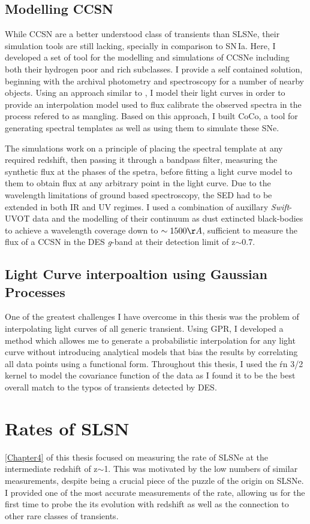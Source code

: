 \subsection{Modelling CCSN}
While CCSN are a better understood class of transients than SLSNe, their simulation tools are still lacking, specially in comparison to SN\,Ia. Here, I developed a set of tool for the modelling and simulations of CCSNe including both their hydrogen poor and rich subclasses. I provide a self contained solution, beginning with the archival photometry and spectroscopy for a number of nearby objects. Using an approach similar to \citet{Bazin2009}, I model their light curves in order to provide an interpolation model used to flux calibrate the observed spectra in the process refered to as mangling. Based on this approach, I built CoCo, a tool for generating spectral templates as well as using them to simulate these SNe.

The simulations work on a principle of placing the spectral template at any required redshift, then passing it through a bandpass filter, measuring the synthetic flux at the phases of the spetra, before fitting a light curve model to them to obtain flux at any arbitrary point in the light curve. Due to the wavelength limitations of ground based spectroscopy, the SED had to be extended in both IR and UV regimes. I used a combination of auxillary \textit{Swift}-UVOT data and the modelling of their continuum as dust extincted black-bodies to achieve a wavelength coverage down to $\sim1500\AA$, sufficient to measure the flux of a CCSN in the DES \textit{g}-band at their detection limit of z$\sim$0.7.

\subsection{Light Curve interpoaltion using Gaussian Processes}
One of the greatest challenges I have overcome in this thesis was the problem of interpolating light curves of all generic transient. Using GPR, I developed a method which allowes me to generate a probabilistic interpolation for any light curve without introducing analytical models that bias the results by correlating all data points using a functional form. Throughout this thesis, I used the \Mate\'rn 3/2 kernel to model the covariance function of the data as I found it to be the best overall match to the typos of transients detected by DES.

\section{Rates of SLSN}
\cref{Chapter4} of this thesis focused on measuring the rate of SLSNe at the intermediate redshift of z$\sim$1. This was motivated by the low numbers of similar measurements, despite being a crucial piece of the puzzle of the origin on SLSNe. I provided one of the most accurate measurements of the rate, allowing us for the first time to probe the its evolution with redshift as well as the connection to other rare classes of transients.

